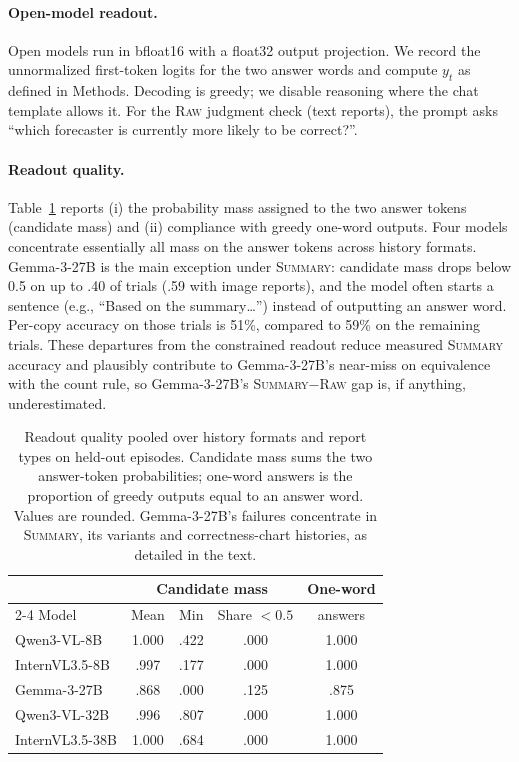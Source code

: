 \documentclass[letterpaper]{article} %
\newcommand{\Raw}{\textsc{Raw}}
\newcommand{\Summary}{\textsc{Summary}}
\begin{document}
\paragraph{Open-model readout.} Open models run in bfloat16 with a float32 output projection. We record the unnormalized first-token logits for the two answer words and compute $y_t$ as defined in Methods. Decoding is greedy; we disable reasoning where the chat template allows it. For the \Raw{} judgment check (text reports), the prompt asks ``which forecaster is currently more likely to be correct?''.

\paragraph{Readout quality.} Table~\ref{tab:readout} reports (i) the probability mass assigned to the two answer tokens (candidate mass) and (ii) compliance with greedy one-word outputs. Four models concentrate essentially all mass on the answer tokens across history formats. Gemma-3-27B is the main exception under \Summary{}: candidate mass drops below 0.5 on up to .40 of trials (.59 with image reports), and the model often starts a sentence (e.g., ``Based on the summary\dots'') instead of outputting an answer word. Per-copy accuracy on those trials is 51\%, compared to 59\% on the remaining trials. These departures from the constrained readout reduce measured \Summary{} accuracy and plausibly contribute to Gemma-3-27B's near-miss on equivalence with the count rule, so Gemma-3-27B's \Summary{}$-$\Raw{} gap is, if anything, underestimated.

\begin{table}[tbp]\centering\small
  \setlength{\tabcolsep}{3pt}
  \begin{tabular}{l cccc}
    \toprule
    & \multicolumn{3}{c}{Candidate mass} & One-word \\
    \cmidrule(lr){2-4}
    Model & Mean & Min & Share $<0.5$ & answers \\
    \midrule
    Qwen3-VL-8B & 1.000 & .422 & .000 & 1.000 \\
    InternVL3.5-8B & .997 & .177 & .000 & 1.000 \\
    Gemma-3-27B & .868 & .000 & .125 & .875 \\
    Qwen3-VL-32B & .996 & .807 & .000 & 1.000 \\
    InternVL3.5-38B & 1.000 & .684 & .000 & 1.000 \\
    \bottomrule
  \end{tabular}
  \caption{Readout quality pooled over history formats and report types on held-out episodes. Candidate mass sums the two answer-token probabilities; one-word answers is the proportion of greedy outputs equal to an answer word. Values are rounded. Gemma-3-27B's failures concentrate in \Summary{}, its variants and correctness-chart histories, as detailed in the text.}
  \label{tab:readout}
\end{table}
\end{document}
